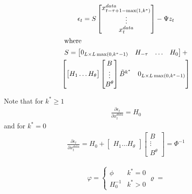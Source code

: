 \documentclass{article}
\begin{document}
{\begin{gather*}
  \epsilon_t= S   \begin{bmatrix}
    x^{data}_{t-\tau+1-\max(1,k^\ast)}\\
\vdots \\ 
   x^{data}_{t}
  \end{bmatrix} - \Psi z_t\\ \intertext{ where }
S=   \begin{bmatrix}
0_{L\times L\max(0,k^\ast-1)}&    H_{-\tau}&\ldots&H_0
  \end{bmatrix} +\\
  \begin{bmatrix}
  \begin{bmatrix}
    H_{1}\ldots H_\theta
  \end{bmatrix} 
\begin{bmatrix}
      B\\\vdots\\B^\theta
    \end{bmatrix}
 \tilde{B}^{k^\ast}
   & 0_{L\times L\max(0,k^\ast-1)}
  \end{bmatrix}
\end{gather*}

Note that for $k^\ast \ge 1$
\begin{gather*}
  \frac{\partial \epsilon_t}{\partial x^{data}_t} = H_0
\end{gather*}
and for $k^\ast = 0$
\begin{gather*}
  \frac{\partial \epsilon_t}{\partial x^{data}_t} = H_0 +   \begin{bmatrix}
    H_{1}\ldots H_\theta
  \end{bmatrix} \begin{bmatrix}
      B\\\vdots\\B^\theta
    \end{bmatrix} = \Phi^{-1}
\end{gather*}

\begin{gather*}
  \varphi = 
  \begin{cases}
    \phi & k^\ast = 0\\
    H_0^{-1} & k^\ast > 0
  \end{cases}
\varrho=
\end{gather*}

}
\end{document}

